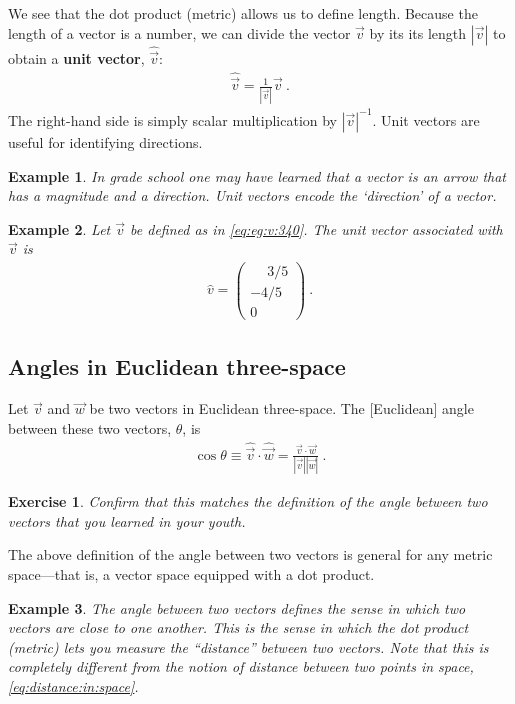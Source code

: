 \documentclass[12pt]{article}
\newtheorem{exercise}{Exercise}[section]
\newtheorem{example}{Example}[section]
\begin{document}
We see that the dot product (metric) allows us to define length. Because the length of a vector is a number, we can divide the vector $\vec{v}$ by its its length $|\vec{v}|$ to obtain a \textbf{unit vector}, $\hat{\vec{v}}$:
\begin{align}
    \hat{\vec{v}} = \frac{1}{|\vec{v}|}\vec{v} \ .
    \label{eq:eg:v:340}
\end{align}
The right-hand side is simply scalar multiplication by $|\vec{v}|^{-1}$. Unit vectors are useful for identifying directions.

\begin{example}
In grade school one may have learned that a vector is an arrow that has a magnitude and a direction. Unit vectors encode the `direction' of a vector.
\end{example}

\begin{example}
Let $\vec{v}$ be defined as in \eqref{eq:eg:v:340}. The unit vector associated with $\vec{v}$ is
\begin{align}
    \hat{v} = 
    \begin{pmatrix}
        \phantom{+}3/5 \\
        -4/5\\
        0
    \end{pmatrix} \ .
\end{align}

\end{example}


\subsection{Angles in Euclidean three-space}

Let $\vec{v}$ and $\vec{w}$ be two vectors in Euclidean three-space. The [Euclidean] angle between these two vectors, $\theta$, is 
\begin{align}
    \cos\theta \equiv \hat{\vec{v}}\cdot\hat{\vec{w}} = \frac{\vec{v}\cdot\vec{w}}{|\vec{v}||\vec{w}|} \ .
\end{align}
\begin{exercise}
Confirm that this matches the definition of the angle between two vectors that you learned in your youth.
\end{exercise}
The above definition of the angle between two vectors is general for any metric space---that is, a vector space equipped with a dot product. 

\begin{example}
The angle between two vectors defines the sense in which two vectors are close to one another. This is the sense in which the dot product (metric) lets you measure the ``distance'' between two vectors. Note that this is completely different from the notion of distance between two points in space, \eqref{eq:distance:in:space}. 
\end{example}
\end{document}

